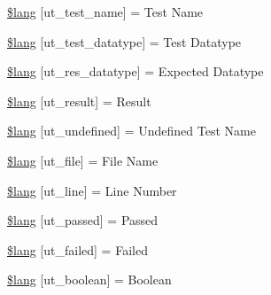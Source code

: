 \begin{DoxyCompactItemize}
\item 
\mbox{\hyperlink{unit__test__lang_8php_a81799dc131f89840fd4ff4bc7c0afc94}{\$lang}} \mbox{[}\textquotesingle{}ut\+\_\+test\+\_\+name\textquotesingle{}\mbox{]} = \textquotesingle{}Test Name\textquotesingle{}
\item 
\mbox{\hyperlink{unit__test__lang_8php_a301df10bea29df793be5796e34235e6a}{\$lang}} \mbox{[}\textquotesingle{}ut\+\_\+test\+\_\+datatype\textquotesingle{}\mbox{]} = \textquotesingle{}Test Datatype\textquotesingle{}
\item 
\mbox{\hyperlink{unit__test__lang_8php_a437ee3cbc146427c03253f7571d09b03}{\$lang}} \mbox{[}\textquotesingle{}ut\+\_\+res\+\_\+datatype\textquotesingle{}\mbox{]} = \textquotesingle{}Expected Datatype\textquotesingle{}
\item 
\mbox{\hyperlink{unit__test__lang_8php_ab1ff13146001ad003f4d92e3fb4b1190}{\$lang}} \mbox{[}\textquotesingle{}ut\+\_\+result\textquotesingle{}\mbox{]} = \textquotesingle{}Result\textquotesingle{}
\item 
\mbox{\hyperlink{unit__test__lang_8php_a52ad90213a43a5add5c6bf03f42b0e8f}{\$lang}} \mbox{[}\textquotesingle{}ut\+\_\+undefined\textquotesingle{}\mbox{]} = \textquotesingle{}Undefined Test Name\textquotesingle{}
\item 
\mbox{\hyperlink{unit__test__lang_8php_acf2db8df5259159b1df4d2c44671187c}{\$lang}} \mbox{[}\textquotesingle{}ut\+\_\+file\textquotesingle{}\mbox{]} = \textquotesingle{}File Name\textquotesingle{}
\item 
\mbox{\hyperlink{unit__test__lang_8php_adee2247694b7dc04e6881f736c6c4dff}{\$lang}} \mbox{[}\textquotesingle{}ut\+\_\+line\textquotesingle{}\mbox{]} = \textquotesingle{}Line Number\textquotesingle{}
\item 
\mbox{\hyperlink{unit__test__lang_8php_a4b08dcf29886acf8206412a4cc3d21ea}{\$lang}} \mbox{[}\textquotesingle{}ut\+\_\+passed\textquotesingle{}\mbox{]} = \textquotesingle{}Passed\textquotesingle{}
\item 
\mbox{\hyperlink{unit__test__lang_8php_ab781daff8ab023276b6460620725f16b}{\$lang}} \mbox{[}\textquotesingle{}ut\+\_\+failed\textquotesingle{}\mbox{]} = \textquotesingle{}Failed\textquotesingle{}
\item 
\mbox{\hyperlink{unit__test__lang_8php_ad6ddfe645648dfbff37f400c198ecb1e}{\$lang}} \mbox{[}\textquotesingle{}ut\+\_\+boolean\textquotesingle{}\mbox{]} = \textquotesingle{}Boolean\textquotesingle{}
\item 

\end{DoxyCompactItemize}
